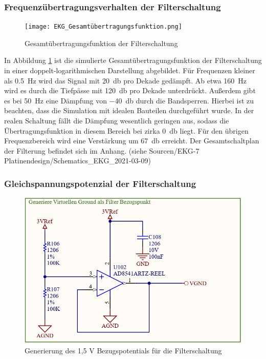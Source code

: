 \subsubsection{Frequenzübertragungsverhalten der Filterschaltung}

\begin{figure} [!h]
	\texttt{[image: EKG\_Gesamtübertragungsfunktion.png]}
	\caption{Gesamtübertragungsfunktion der Filterschaltung}
	\label{Bodediagramm Filterschaltung} 
\end{figure}

In Abbildung \ref{Bodediagramm Filterschaltung} ist die simulierte Gesamtübertragungsfunktion der Filterschaltung in einer doppelt-logarithmischen Darstellung abgebildet. Für Frequenzen kleiner als \SI{0,5}{\hertz} wird das Signal mit \SI{20}{\decibel} pro Dekade gedämpft. Ab etwa \SI{160}{\hertz} wird es durch die Tiefpässe mit \SI{120}{\decibel} pro Dekade unterdrückt. Außerdem gibt es bei \SI{50}{\hertz} eine Dämpfung von \SI{-40}{\decibel} durch die Bandsperren. Hierbei ist zu beachten, dass die Simulation mit idealen Bauteilen durchgeführt wurde. In der realen Schaltung fällt die Dämpfung wesentlich geringen aus, sodass die Übertragungsfunktion in diesem Bereich bei zirka \SI{0}{\decibel} liegt. Für den übrigen Frequenzbereich wird eine Verstärkung um \SI{67}{\decibel} erreicht. Der Gesamtschaltplan der Filterung befindet sich im Anhang. (siehe Sourcen/EKG-7 Platinendesign/Schematics\_EKG\_2021-03-09)

\subsubsection{Gleichspannungspotenzial der Filterschaltung}

\begin{figure} [!h]
	\includegraphics[width=\textwidth] {EKG_virtueller_Ground.png}
	\caption{Generierung des 1,5 V Bezugspotentials für die Filterschaltung}
	\label{Virtueller GND} 
\end{figure}

